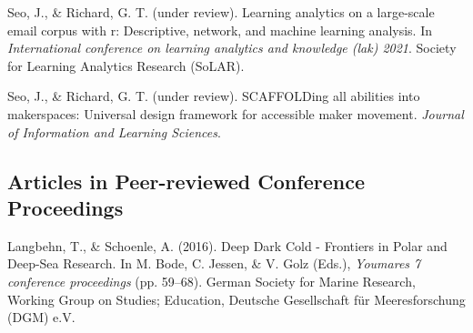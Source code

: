\documentclass[11pt, a4paper]{awesome-cv}
\begin{document}
\leavevmode\hypertarget{ref-seo2021mboxr}{}%
Seo, J., \& Richard, G. T. (under review). Learning analytics on a
large-scale email corpus with r: Descriptive, network, and machine
learning analysis. In \emph{International conference on learning
analytics and knowledge (lak) 2021}. Society for Learning Analytics
Research (SoLAR).

\leavevmode\hypertarget{ref-scaffold}{}%
Seo, J., \& Richard, G. T. (under review). SCAFFOLDing all abilities
into makerspaces: Universal design framework for accessible maker
movement. \emph{Journal of Information and Learning Sciences}.

\hypertarget{articles-in-peer-reviewed-conference-proceedings}{%
\subsection{Articles in Peer-reviewed Conference
Proceedings}\label{articles-in-peer-reviewed-conference-proceedings}}

\hypertarget{refs_proceedings}{}
\leavevmode\hypertarget{ref-Langbehn2016c}{}%
Langbehn, T., \& Schoenle, A. (2016). Deep \textbar{} Dark \textbar{}
Cold - Frontiers in Polar and Deep-Sea Research. In M. Bode, C. Jessen,
\& V. Golz (Eds.), \emph{Youmares 7 conference proceedings} (pp.
59--68). German Society for Marine Research, Working Group on Studies;
Education, Deutsche Gesellschaft für Meeresforschung (DGM) e.V.
\end{document}
